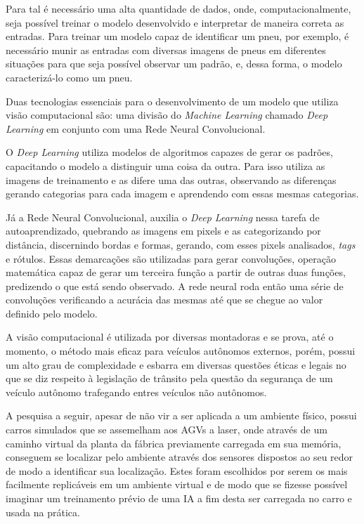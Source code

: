 Para tal é necessário uma alta quantidade de dados, onde, computacionalmente,
seja possível treinar o modelo desenvolvido e interpretar de maneira correta as
entradas. Para treinar um modelo capaz de identificar um pneu, por exemplo, é
necessário munir as entradas com diversas imagens de pneus em diferentes
situações para que seja possível observar um padrão, e, dessa forma, o modelo
caracterizá-lo como um pneu.

Duas tecnologias essenciais para o desenvolvimento de um modelo que utiliza
visão computacional são: uma divisão do \textit{Machine Learning} chamado
\textit{Deep Learning} em conjunto com uma Rede Neural Convolucional.

O \textit{Deep Learning} utiliza modelos de algoritmos capazes de gerar os
padrões, capacitando o modelo a distinguir uma coisa da outra. Para isso
utiliza as imagens de treinamento e as difere uma das outras, observando as
diferenças gerando categorias para cada imagem e aprendendo com essas mesmas
categorias.

Já a Rede Neural Convolucional, auxilia o \textit{Deep Learning} nessa tarefa
de autoaprendizado, quebrando as imagens em pixels e as categorizando por
distância, discernindo bordas e formas, gerando, com esses pixels analisados,
\textit{tags} e rótulos. Essas demarcações são utilizadas para gerar convoluções,
operação matemática capaz de gerar um terceira função a partir de outras duas
funções, predizendo o que está sendo observado. A rede neural roda então uma
série de convoluções verificando a acurácia das mesmas até que se chegue ao valor
definido pelo modelo.

A visão computacional é utilizada por diversas montadoras e se prova, até o
momento, o método mais eficaz para veículos autônomos externos, porém, possui um
alto grau de complexidade e esbarra em diversas questões éticas e legais no que
se diz respeito à legislação de trânsito pela questão da segurança de um
veículo autônomo trafegando entres veículos não autônomos.

A pesquisa a seguir, apesar de não vir a ser aplicada a um ambiente físico, 
possui carros simulados que se assemelham aos AGVs a laser, onde através de um caminho virtual 
da planta da fábrica previamente carregada em sua memória, conseguem se localizar pelo ambiente através 
dos sensores dispostos ao seu redor de modo a identificar sua localização. Estes foram escolhidos por 
serem os mais facilmente replicáveis em um ambiente virtual e de modo que se fizesse possível imaginar um 
treinamento prévio de uma IA a fim desta ser carregada no carro e usada na prática.